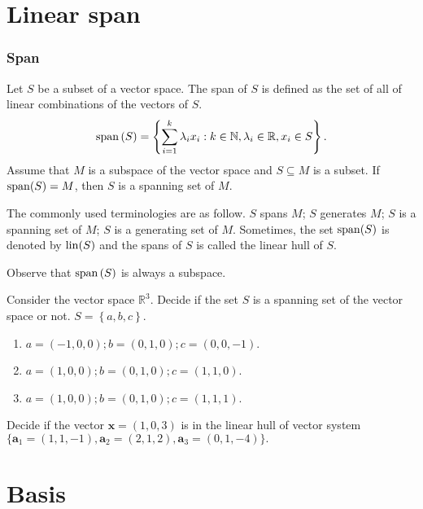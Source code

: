 \section{Linear span}
\begin{frame}\frametitle{Span}
    \begin{definition}
    Let $S$ be a subset of a vector space.
    The \alert{span} of $S$ is defined as the set of all of linear combinations of the vectors of $S$.
    \[
        \operatorname{span}\left( S \right)
        =
        \left\{ \sum_{i=1}^k\lambda_ix_i:k\in\mathbb{N},\lambda_i\in\mathbb{R}, x_i\in S \right\}.
    \]
    Assume that $M$ is a subspace of the vector space and $S\subseteq M$ is a subset.
    If $\operatorname{span}(S)=M$, then $S$ is a \alert{spanning set of } $M$.
    \end{definition}
    The commonly used terminologies are as follow.
    $S$ spans $M$; $S$ generates $M$; $S$ is a spanning set of $M$; $S$ is a generating set of $M$.
    Sometimes, the set $\operatorname{span}(S)$ is denoted by $\operatorname{lin}(S)$ and the spans of $S$ is called \alert{the linear hull} of $S$.

    Observe that $\operatorname{span}\left( S \right)$ is always a subspace.
\end{frame}
\begin{frame}
    \begin{example}
        Consider the vector space $\mathbb{R}^3$.
        Decide if the set $S$ is a spanning set of the vector space or not.
        $S=\left\{ a,b,c \right\}$.
        \begin{enumerate}
            \item $a=(-1,0,0); b=\left( 0,1,0 \right); c=\left( 0,0,-1 \right)$.
            \item $a=(1,0,0); b=\left( 0,1,0 \right); c=\left( 1,1,0 \right)$.
            \item $a=(1,0,0); b=\left( 0,1,0 \right); c=\left( 1,1,1 \right)$.
        \end{enumerate}
    \end{example}
\end{frame}
\begin{frame}
\begin{example}
Decide if the vector $\mathbf{x}=(1,0,3)$ is in the linear hull of vector system $\{\mathbf{a}_1=(1,1,-1),\mathbf{a}_2=(2,1,2),\mathbf{a}_3=(0,1,-4)\}.$
\end{example}
\end{frame}
\section{Basis}

